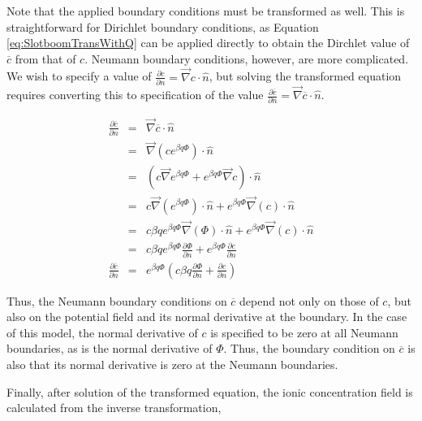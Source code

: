 Note that the applied boundary conditions must be transformed as well.
This is straightforward for Dirichlet boundary conditions,
as Equation \ref{eq:SlotboomTransWithQ} can be applied directly
to obtain the Dirchlet value of $\overline{c}$ from that of $c$.
Neumann boundary conditions, however, are more complicated.
We wish to specify a value of $\frac{\partial c}{\partial n} = \vec{\nabla} c \cdot \hat{n}$,
but solving the transformed equation requires converting this to specification of the value
$\frac{\partial \overline{c}}{\partial n} = \vec{\nabla} \overline{c} \cdot \hat{n}$.

\begin{equation}\begin{array}{rcl}
  \frac{\partial \overline{c}}{\partial n} & = & \vec{\nabla} \overline{c} \cdot \hat{n} \\
  & = & \vec{\nabla} \left( c e^{\beta q \Phi} \right) \cdot \hat{n} \\
  & = & \left( c \vec{\nabla} e^{\beta q \Phi} +  e^{\beta q \Phi} \vec{\nabla} c \right) \cdot \hat{n} \\
  & = & c \vec{\nabla} \left(e^{\beta q \Phi} \right) \cdot \hat{n}
  + e^{\beta q \Phi} \vec{\nabla} \left( c \right) \cdot \hat{n} \\
  & = & c \beta q e^{\beta q \Phi} \vec{\nabla} \left( \Phi \right) \cdot \hat{n}
  + e^{\beta q \Phi} \vec{\nabla} \left( c \right) \cdot \hat{n} \\
  & = & c \beta q e^{\beta q \Phi} \frac{\partial \Phi}{\partial n}
  + e^{\beta q \Phi} \frac{\partial c}{\partial n} \\
  \frac{\partial \overline{c}}{\partial n} & = & e^{\beta q \Phi}
  \left( c \beta q \frac{\partial \Phi}{\partial n} + \frac{\partial c}{\partial n} \right)
\end{array}\end{equation}

Thus, the Neumann boundary conditions on $\overline{c}$ depend not only on
those of $c$, but also on the potential field and its normal derivative at the boundary.
In the case of this model, the normal derivative of $c$ is specified to be zero
at all Neumann boundaries, as is the normal derivative of $\Phi$.
Thus, the boundary condition on $\overline{c}$ is also that its normal derivative is zero
at the Neumann boundaries.

Finally, after solution of the transformed equation,
the ionic concentration field is calculated from the inverse transformation,

